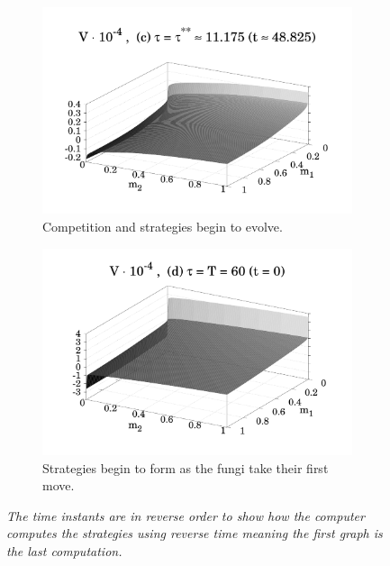 \documentclass[11pt]{amsart}
\begin{document}
\begin{figure}
\begin{subfigure}{.48 \textwidth}
        \includegraphics[width = \textwidth]{figures/Figure_4c_1.pdf}
        \caption{Competition and strategies begin to evolve.}
        \label{fig_4_c}
    \end{subfigure}
    \hfill
    \begin{subfigure}{.48 \textwidth}
        \includegraphics[width = \textwidth]{figures/Figure_4d_1.pdf}
        \caption{Strategies begin to form as the fungi take their first move.}
        \label{fig_4_d}
    \end{subfigure}

\bf \caption{\it The time instants are in reverse order to show how the computer computes the strategies using reverse time meaning the first graph is the last computation.}
\label{Fig_4}
\end{figure}
\end{document}

